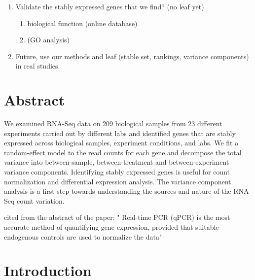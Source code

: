 \documentclass[letterpaper,12pt]{article}
\begin{document}
\begin{enumerate}
    \item
	Validate the stably expressed genes that we find? (no leaf yet) 
	\begin{enumerate}
	    \item
		biological function (online database) 
	    \item
		(GO analysis)
	\end{enumerate}

    \item
	Future, use our methods and leaf (stable set, rankings, variance
	components) in real studies.
\end{enumerate}

\newpage

\section*{Abstract}
We examined RNA-Seq data on 209 biological samples from 23 different
experiments carried out by different labs and identified genes that are stably
expressed across biological samples, experiment conditions, and labs. We fit a
random-effect model to the read counts for each gene and decompose the total
variance into between-sample, between-treatment and between-experiment variance
components. Identifying stably expressed genes is useful for count
normalization and differential expression analysis. The variance component analysis is a first step towards understanding the sources and nature of the RNA-Seq count variation.


cited from the abstract of the paper: " Real-time PCR (qPCR) is the most accurate method of quantifying gene expression, provided that suitable endogenous controls are used to normalize the data"
\section{Introduction}\label{section:Introduction}
\end{document}
